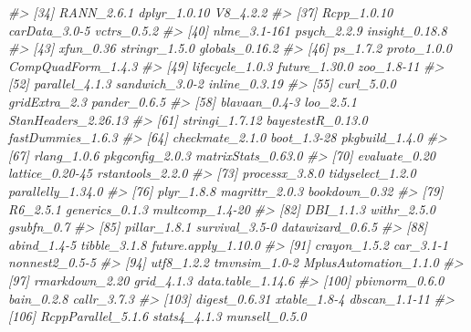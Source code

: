 \documentclass[
  man,floatsintext]{apa6}
\newenvironment{Shaded}{\begin{snugshade}}{\end{snugshade}}
\newcommand{\CommentTok}[1]{\textcolor[rgb]{0.56,0.35,0.01}{\textit{#1}}}
\begin{document}
\begin{Shaded}
\begin{Highlighting}[]
\CommentTok{\#\textgreater{}  [34] RANN\_2.6.1            dplyr\_1.0.10          V8\_4.2.2             }
\CommentTok{\#\textgreater{}  [37] Rcpp\_1.0.10           carData\_3.0{-}5         vctrs\_0.5.2          }
\CommentTok{\#\textgreater{}  [40] nlme\_3.1{-}161          psych\_2.2.9           insight\_0.18.8       }
\CommentTok{\#\textgreater{}  [43] xfun\_0.36             stringr\_1.5.0         globals\_0.16.2       }
\CommentTok{\#\textgreater{}  [46] ps\_1.7.2              proto\_1.0.0           CompQuadForm\_1.4.3   }
\CommentTok{\#\textgreater{}  [49] lifecycle\_1.0.3       future\_1.30.0         zoo\_1.8{-}11           }
\CommentTok{\#\textgreater{}  [52] parallel\_4.1.3        sandwich\_3.0{-}2        inline\_0.3.19        }
\CommentTok{\#\textgreater{}  [55] curl\_5.0.0            gridExtra\_2.3         pander\_0.6.5         }
\CommentTok{\#\textgreater{}  [58] blavaan\_0.4{-}3         loo\_2.5.1             StanHeaders\_2.26.13  }
\CommentTok{\#\textgreater{}  [61] stringi\_1.7.12        bayestestR\_0.13.0     fastDummies\_1.6.3    }
\CommentTok{\#\textgreater{}  [64] checkmate\_2.1.0       boot\_1.3{-}28           pkgbuild\_1.4.0       }
\CommentTok{\#\textgreater{}  [67] rlang\_1.0.6           pkgconfig\_2.0.3       matrixStats\_0.63.0   }
\CommentTok{\#\textgreater{}  [70] evaluate\_0.20         lattice\_0.20{-}45       rstantools\_2.2.0     }
\CommentTok{\#\textgreater{}  [73] processx\_3.8.0        tidyselect\_1.2.0      parallelly\_1.34.0    }
\CommentTok{\#\textgreater{}  [76] plyr\_1.8.8            magrittr\_2.0.3        bookdown\_0.32        }
\CommentTok{\#\textgreater{}  [79] R6\_2.5.1              generics\_0.1.3        multcomp\_1.4{-}20      }
\CommentTok{\#\textgreater{}  [82] DBI\_1.1.3             withr\_2.5.0           gsubfn\_0.7           }
\CommentTok{\#\textgreater{}  [85] pillar\_1.8.1          survival\_3.5{-}0        datawizard\_0.6.5     }
\CommentTok{\#\textgreater{}  [88] abind\_1.4{-}5           tibble\_3.1.8          future.apply\_1.10.0  }
\CommentTok{\#\textgreater{}  [91] crayon\_1.5.2          car\_3.1{-}1             nonnest2\_0.5{-}5       }
\CommentTok{\#\textgreater{}  [94] utf8\_1.2.2            tmvnsim\_1.0{-}2         MplusAutomation\_1.1.0}
\CommentTok{\#\textgreater{}  [97] rmarkdown\_2.20        grid\_4.1.3            data.table\_1.14.6    }
\CommentTok{\#\textgreater{} [100] pbivnorm\_0.6.0        bain\_0.2.8            callr\_3.7.3          }
\CommentTok{\#\textgreater{} [103] digest\_0.6.31         xtable\_1.8{-}4          dbscan\_1.1{-}11        }
\CommentTok{\#\textgreater{} [106] RcppParallel\_5.1.6    stats4\_4.1.3          munsell\_0.5.0}
\end{Highlighting}
\end{Shaded}
\end{document}
